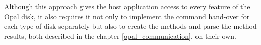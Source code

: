 Although this approach gives the host application access to every feature of the Opal disk, it also requires it not only to implement the command hand-over for each type of disk separately but also to create the methods and parse the method results, both described in the chapter \ref{opal_communication}, on their own.




 